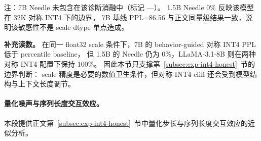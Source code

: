 \begin{table}[!htbp]
  \centering
  \caption{INT4 量化 scale 精度敏感性实验
    （32K 序列，PPL 为固定序列 likelihood，Needle 使用三个固定种子的贪婪生成）}
  \label{tab:app-scale-precision}
  \begin{tablenotes}
    \footnotesize
    \item 注：7B Needle 未包含在该诊断消融中（标记 ---）。
    1.5B Needle 0\% 反映该模型在 32K 对称 INT4 下的边界。
    7B 基线 PPL=86.56 与正文同量级结果一致，说明该敏感性不是 scale dtype 单点造成。
  \end{tablenotes}
\end{table}

\textbf{补充读数。}
在同一 float32 scale 条件下，7B 的 behavior-guided 对称 INT4 PPL 低于 percentile baseline，
但 1.5B 的 Needle 仍为 0\%，LLaMA-3.1-8B 则在两种对称 INT4 配置下保持 100\%。
因此本节只支撑第~\ref{subsec:exp-int4-honest}~节的边界判断：
scale 精度是必要的数值卫生条件，但对称 INT4 cliff 还会受到模型结构与上下文长度调节。

\paragraph{量化噪声与序列长度交互效应。}
\label{sec:app-sqnr-derivation}
本段提供正文第~\ref{subsec:exp-int4-honest}~节中量化步长与序列长度交互效应的近似分析。

